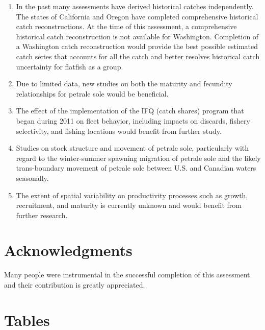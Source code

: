 \documentclass[12pt,]{article}
\begin{document}
\begin{enumerate}

\item In the past many assessments have derived historical catches independently. The states of California and Oregon have completed comprehensive historical catch reconstructions. At the time of this assessment, a comprehensive historical catch reconstruction is not available for Washington. Completion of a Washington catch reconstruction would provide the best possible estimated catch series that accounts for all the catch and better resolves historical catch uncertainty for flatfish as a group. 

\item Due to limited data, new studies on both the maturity and fecundity relationships for petrale sole would be beneficial.

\item The effect of the implementation of the IFQ (catch shares) program that began during 2011 on fleet behavior, including impacts on discards, fishery selectivity, and fishing locations would benefit from further study.

\item Studies on stock structure and movement of petrale sole, particularly with regard to the winter-summer spawning migration of petrale sole and the likely trans-boundary movement of petrale sole between U.S. and Canadian waters seasonally.

\item The extent of spatial variability on productivity processes such as growth, recruitment, and maturity is currently unknown and would benefit from further research.

\end{enumerate}

\section{Acknowledgments}\label{acknowledgments}

Many people were instrumental in the successful completion of this
assessment and their contribution is greatly appreciated.

\newpage

\FloatBarrier

\section{Tables}\label{tables}
\end{document}
